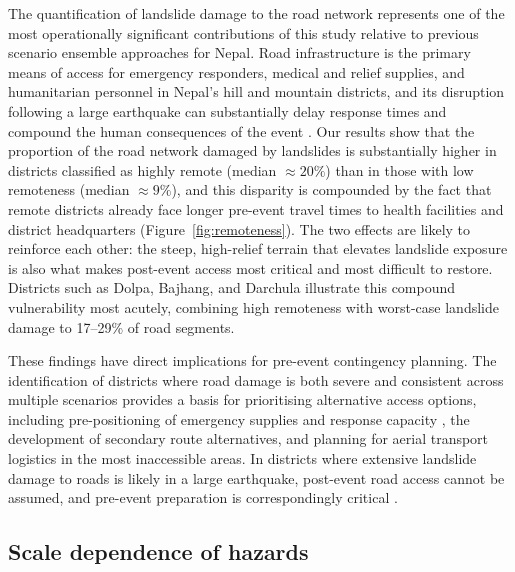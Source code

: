 \documentclass[preprint,12pt,authoryear]{elsarticle}
\begin{document}
The quantification of landslide damage to the road network represents one of the most operationally significant contributions of this study relative to previous scenario ensemble approaches for Nepal. Road infrastructure is the primary means of access for emergency responders, medical and relief supplies, and humanitarian personnel in Nepal's hill and mountain districts, and its disruption following a large earthquake can substantially delay response times and compound the human consequences of the event \citep{Koks2019, NationalPlanningCommission2015}. Our results show that the proportion of the road network damaged by landslides is substantially higher in districts classified as highly remote (median $\approx 20\%$) than in those with low remoteness (median $\approx 9\%$), and this disparity is compounded by the fact that remote districts already face longer pre-event travel times to health facilities and district headquarters (Figure~\ref{fig:remoteness}). The two effects are likely to reinforce each other: the steep, high-relief terrain that elevates landslide exposure is also what makes post-event access most critical and most difficult to restore. Districts such as Dolpa, Bajhang, and Darchula illustrate this compound vulnerability most acutely, combining high remoteness with worst-case landslide damage to 17--29\% of road segments.

These findings have direct implications for pre-event contingency planning. The identification of districts where road damage is both severe and consistent across multiple scenarios provides a basis for prioritising alternative access options, including pre-positioning of emergency supplies and response capacity \citep{Sijapati2024}, the development of secondary route alternatives, and planning for aerial transport logistics in the most inaccessible areas. In districts where extensive landslide damage to roads is likely in a large earthquake, post-event road access cannot be assumed, and pre-event preparation is correspondingly critical \citep{IASC2007}.

\subsection{Scale dependence of hazards}
\end{document}
